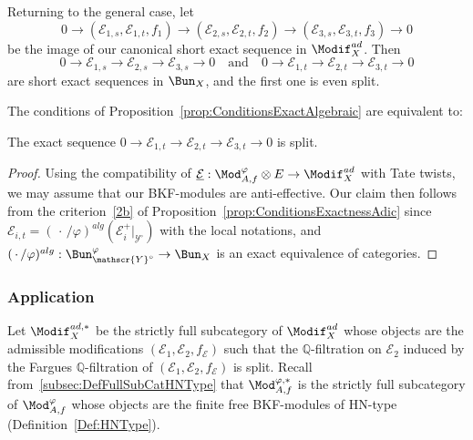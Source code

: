 Returning to the general case, let
\[
0\rightarrow(\mathcal{E}_{1,s},\mathcal{E}_{1,t},f_{1})\rightarrow(\mathcal{E}_{2,s},\mathcal{E}_{2,t},f_{2})\rightarrow(\mathcal{E}_{3,s},\mathcal{E}_{3,t},f_{3})\rightarrow0
\]
be the image of our canonical short exact sequence in $\Modif_{X}^{ad}$. Then
\[
0\rightarrow\mathcal{E}_{1,s}\rightarrow\mathcal{E}_{2,s}\rightarrow\mathcal{E}_{3,s}\rightarrow0\quad\text{and}\quad0\rightarrow\mathcal{E}_{1,t}\rightarrow\mathcal{E}_{2,t}\rightarrow\mathcal{E}_{3,t}\rightarrow0
\]
are short exact sequences in $\Bun_{X}$, and the first one is even split.

\begin{prop}\label{prop:CritExactOnModif}
The conditions of Proposition~\ref{prop:ConditionsExactAlgebraic} are equivalent to:

The exact sequence $0\rightarrow\mathcal{E}_{1,t}\rightarrow\mathcal{E}_{2,t}\rightarrow\mathcal{E}_{3,t}\rightarrow0$ is split.
\end{prop}

\begin{proof}
Using the compatibility of $\underline{\mathcal{E}}:\Mod_{A,f}^{\varphi}\otimes E\rightarrow\Modif_{X}^{ad}$ with Tate twists, we may assume that our BKF-modules are anti-effective. Our claim then follows from the criterion~\eqref{2b} of Proposition~\ref{prop:ConditionsExactnessAdic} since $\mathcal{E}_{i,t}=({\,\cdot\,}/\varphi)^{alg}(\mathscr{E}_{i}^{+}\vert_{\mathscr{Y}^{\circ}})$ with the local notations, and $({\,\cdot\,}/\varphi)^{alg}:\Bun_{\mathscr{Y}^{\circ}}^{\varphi}\rightarrow\Bun_{X}$ is an exact equivalence of categories.
\end{proof}

\subsubsection{Application}

Let $\Modif_{X}^{ad,\ast}$ be the strictly full subcategory of $\Modif_{X}^{ad}$ whose objects are the admissible modifications $(\mathcal{E}_{1},\mathcal{E}_{2},f_{\mathcal{E}})$ such that the $\mathbb{Q}$-filtration on $\mathcal{E}_{2}$ induced by the Fargues $\mathbb{Q}$-filtration of $(\mathcal{E}_{1},\mathcal{E}_{2},f_{\mathcal{E}})$ is split. Recall from~\ref{subsec:DefFullSubCatHNType} that $\Mod_{A,f}^{\varphi,\ast}$ is the strictly full subcategory of $\Mod_{A,f}^{\varphi}$ whose objects are the finite free BKF-modules of HN-type (Definition~\ref{Def:HNType}).

